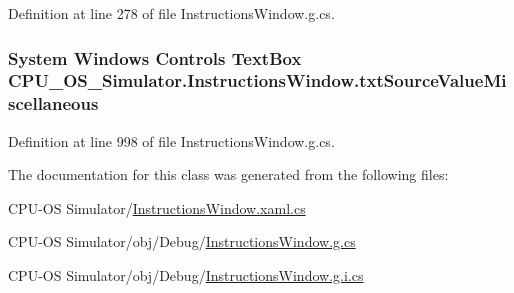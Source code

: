 Definition at line 278 of file Instructions\+Window.\+g.\+cs.

\hypertarget{class_c_p_u___o_s___simulator_1_1_instructions_window_a555d604d5869d89442a35900abc35914}{}
\subsubsection[{txt\+Source\+Value\+Miscellaneous}]{\setlength{\rightskip}{0pt plus 5cm}System Windows Controls Text\+Box C\+P\+U\+\_\+\+O\+S\+\_\+\+Simulator.\+Instructions\+Window.\+txt\+Source\+Value\+Miscellaneous\hspace{0.3cm}{\ttfamily [package]}}\label{class_c_p_u___o_s___simulator_1_1_instructions_window_a555d604d5869d89442a35900abc35914}


Definition at line 998 of file Instructions\+Window.\+g.\+cs.



The documentation for this class was generated from the following files\+:\begin{DoxyCompactItemize}
\item 
C\+P\+U-\/\+O\+S Simulator/\hyperlink{_instructions_window_8xaml_8cs}{Instructions\+Window.\+xaml.\+cs}\item 
C\+P\+U-\/\+O\+S Simulator/obj/\+Debug/\hyperlink{_instructions_window_8g_8cs}{Instructions\+Window.\+g.\+cs}\item 
C\+P\+U-\/\+O\+S Simulator/obj/\+Debug/\hyperlink{_instructions_window_8g_8i_8cs}{Instructions\+Window.\+g.\+i.\+cs}\end{DoxyCompactItemize}
